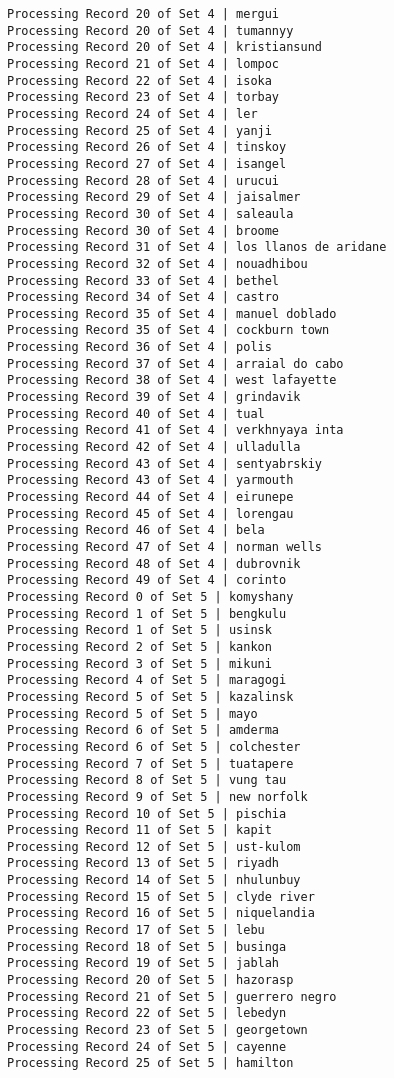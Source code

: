 \documentclass[11pt]{article}
\begin{document}
\begin{Verbatim}[commandchars=\\\{\}]
Processing Record 20 of Set 4 | mergui
Processing Record 20 of Set 4 | tumannyy
Processing Record 20 of Set 4 | kristiansund
Processing Record 21 of Set 4 | lompoc
Processing Record 22 of Set 4 | isoka
Processing Record 23 of Set 4 | torbay
Processing Record 24 of Set 4 | ler
Processing Record 25 of Set 4 | yanji
Processing Record 26 of Set 4 | tinskoy
Processing Record 27 of Set 4 | isangel
Processing Record 28 of Set 4 | urucui
Processing Record 29 of Set 4 | jaisalmer
Processing Record 30 of Set 4 | saleaula
Processing Record 30 of Set 4 | broome
Processing Record 31 of Set 4 | los llanos de aridane
Processing Record 32 of Set 4 | nouadhibou
Processing Record 33 of Set 4 | bethel
Processing Record 34 of Set 4 | castro
Processing Record 35 of Set 4 | manuel doblado
Processing Record 35 of Set 4 | cockburn town
Processing Record 36 of Set 4 | polis
Processing Record 37 of Set 4 | arraial do cabo
Processing Record 38 of Set 4 | west lafayette
Processing Record 39 of Set 4 | grindavik
Processing Record 40 of Set 4 | tual
Processing Record 41 of Set 4 | verkhnyaya inta
Processing Record 42 of Set 4 | ulladulla
Processing Record 43 of Set 4 | sentyabrskiy
Processing Record 43 of Set 4 | yarmouth
Processing Record 44 of Set 4 | eirunepe
Processing Record 45 of Set 4 | lorengau
Processing Record 46 of Set 4 | bela
Processing Record 47 of Set 4 | norman wells
Processing Record 48 of Set 4 | dubrovnik
Processing Record 49 of Set 4 | corinto
Processing Record 0 of Set 5 | komyshany
Processing Record 1 of Set 5 | bengkulu
Processing Record 1 of Set 5 | usinsk
Processing Record 2 of Set 5 | kankon
Processing Record 3 of Set 5 | mikuni
Processing Record 4 of Set 5 | maragogi
Processing Record 5 of Set 5 | kazalinsk
Processing Record 5 of Set 5 | mayo
Processing Record 6 of Set 5 | amderma
Processing Record 6 of Set 5 | colchester
Processing Record 7 of Set 5 | tuatapere
Processing Record 8 of Set 5 | vung tau
Processing Record 9 of Set 5 | new norfolk
Processing Record 10 of Set 5 | pischia
Processing Record 11 of Set 5 | kapit
Processing Record 12 of Set 5 | ust-kulom
Processing Record 13 of Set 5 | riyadh
Processing Record 14 of Set 5 | nhulunbuy
Processing Record 15 of Set 5 | clyde river
Processing Record 16 of Set 5 | niquelandia
Processing Record 17 of Set 5 | lebu
Processing Record 18 of Set 5 | businga
Processing Record 19 of Set 5 | jablah
Processing Record 20 of Set 5 | hazorasp
Processing Record 21 of Set 5 | guerrero negro
Processing Record 22 of Set 5 | lebedyn
Processing Record 23 of Set 5 | georgetown
Processing Record 24 of Set 5 | cayenne
Processing Record 25 of Set 5 | hamilton

\end{Verbatim}
\end{document}
